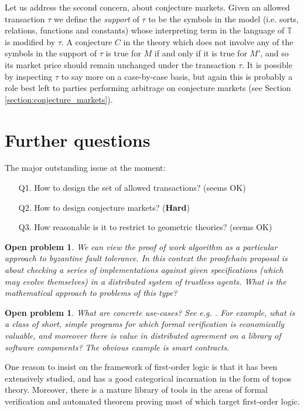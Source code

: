 \documentclass[english,letter paper,12pt,reqno]{article}
\theoremstyle{example}
\newtheorem{problem}[theorem]{Open problem}
\begin{document}
Let us address the second concern, about conjecture markets. Given an allowed transaction $\tau$ we define the \emph{support} of $\tau$ to be the symbols in the model (i.e. sorts, relations, functions and constants) whose interpreting term in the language of $\mathbb{T}$ is modified by $\tau$. A conjecture $C$ in the theory which does not involve any of the symbols in the support of $\tau$ is true for $M$ if and only if it is true for $M'$, and so its market price should remain unchanged under the transaction $\tau$. It is possible by inspecting $\tau$ to say more on a case-by-case basis, but again this is probably a role best left to parties performing arbitrage on conjecture markets (see Section \ref{section:conjecture_markets}).

\section{Further questions}

The major outstanding issue at the moment:
\begin{itemize}
\item[Q1.] How to design the set of allowed transactions? (seems OK)
\item[Q2.] How to design conjecture markets? (\textbf{Hard})
\item[Q3.] How reasonable is it to restrict to geometric theories? (seems OK)
\end{itemize}

\begin{problem} We can view the proof of work algorithm as a particular approach to byzantine fault tolerance. In this context the proofchain proposal is about checking a series of implementations against given specifications (which may evolve themselves) in a distributed system of trustless agents. What is the mathematical approach to problems of this type?
\end{problem}

\begin{problem} What are concrete use-cases? See e.g. \cite{claessen}. For example, what is a class of short, simple programs for which formal verification is economically valuable, and moreover there is value in distributed agreement on a library of software components? The obvious example is smart contracts.
\end{problem}

One reason to insist on the framework of first-order logic is that it has been extensively studied, and has a good categorical incarnation in the form of topos theory. Moreover, there is a mature library of tools in the areas of formal verification and automated theorem proving most of which target first-order logic. %
\end{document}
